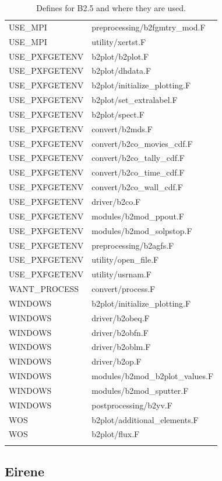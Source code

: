 \documentclass[a4paper,10pt]{report}
\begin{document}
\begin{center}
\begin{longtable}{|l|l|}
USE\_MPI & preprocessing/b2fgmtry\_mod.F \\
USE\_MPI & utility/xertst.F \\
USE\_PXFGETENV & b2plot/b2plot.F \\
USE\_PXFGETENV & b2plot/dhdata.F \\
USE\_PXFGETENV & b2plot/initialize\_plotting.F \\
USE\_PXFGETENV & b2plot/set\_extralabel.F \\
USE\_PXFGETENV & b2plot/spect.F \\
USE\_PXFGETENV & convert/b2mds.F \\
USE\_PXFGETENV & convert/b2co\_movies\_cdf.F \\
USE\_PXFGETENV & convert/b2co\_tally\_cdf.F \\
USE\_PXFGETENV & convert/b2co\_time\_cdf.F \\
USE\_PXFGETENV & convert/b2co\_wall\_cdf.F \\
USE\_PXFGETENV & driver/b2co.F \\
USE\_PXFGETENV & modules/b2mod\_ppout.F \\
USE\_PXFGETENV & modules/b2mod\_solpstop.F \\
USE\_PXFGETENV & preprocessing/b2agfs.F \\
USE\_PXFGETENV & utility/open\_file.F \\
USE\_PXFGETENV & utility/usrnam.F \\
WANT\_PROCESS & convert/process.F \\
WINDOWS & b2plot/initialize\_plotting.F \\
WINDOWS & driver/b2obeq.F \\
WINDOWS & driver/b2obfn.F \\
WINDOWS & driver/b2oblm.F \\
WINDOWS & driver/b2op.F \\
WINDOWS & modules/b2mod\_b2plot\_values.F \\
WINDOWS & modules/b2mod\_sputter.F \\
WINDOWS & postprocessing/b2yv.F \\
WOS & b2plot/additional\_elements.F \\
WOS & b2plot/flux.F \\
    \hline
    \caption{Defines for B2.5 and where they are used.}
    \label{tab:B2defines}
  \end{longtable}
\end{center}

\subsection{Eirene}
\end{document}
